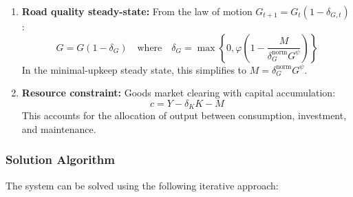 \begin{enumerate}
    \item \textbf{Road quality steady-state:} From the law of motion $G_{t+1} = G_t(1-\delta_{G,t})$:
    \begin{equation}
    G = G(1-\delta_G) \quad \text{where} \quad \delta_G = \max\left\{0, \varphi\left(1 - \frac{M}{\delta_G^{\text{norm}} G^{\psi}}\right)\right\}
    \end{equation}
    In the minimal-upkeep steady state, this simplifies to $M = \delta_G^{\text{norm}} G^{\psi}$.

    \item \textbf{Resource constraint:} Goods market clearing with capital accumulation:
    \begin{equation}
    c = Y - \delta_K K - M
    \end{equation}
    This accounts for the allocation of output between consumption, investment, and maintenance.
\end{enumerate}

\subsubsection{Solution Algorithm}

The system can be solved using the following iterative approach:

